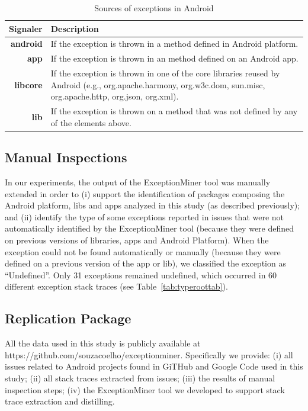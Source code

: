 
\begin{table}
  \centering
  \begin{tabular}{rp{29em}}
    \hline
    \bfseries{Signaler} & \bfseries{Description} \\
    \hline
    \bfseries{android} & If the exception is thrown in a method defined in Android platform.\\
    \bfseries{app}     & If the exception is thrown in an method defined on an Android app.\\
    \bfseries{libcore} & If the exception is thrown in one of the core libraries reused by Android (e.g., org.apache.harmony, org.w3c.dom, sun.misc, org.apache.http, org.json, org.xml). \\
    \bfseries{lib}     & If the exception is thrown on a method that was not defined by any of the elements above.\\
    \hline
  \end{tabular}
  \caption{Sources of exceptions in Android}
  \label{tab:signalers}
\end{table}

\subsection{Manual Inspections}
\label{sec:manual}
In our experiments, the output of the ExceptionMiner tool was manually extended
in order to 
(i) support the identification of packages composing the Android platform, 
libs and apps analyzed in this study (as described previously); and (ii)  
identify the type of some exceptions reported in issues 
that were not automatically identified by the ExceptionMiner tool
(because they were defined on previous versions of libraries,
apps and Android Platform). When the exception could not be  
found automatically or manually (because they were defined on a previous version
of the app or lib), we classified the exception as ``Undefined''.  Only 31 exceptions 
remained undefined, which occurred in 60 different exception stack traces (see Table~\ref{tab:typeroottab}).

\subsection{Replication Package}
All the data used in this study is publicly available at https://github.com/souzacoelho/exceptionminer.
Specifically we provide: (i) all issues related to Android projects found
in GiTHub and Google Code used in this study; (ii) all stack traces extracted
from issues; (iii) the results of manual inspection steps; (iv) the
ExceptionMiner tool we developed to support stack trace extraction and distilling.

